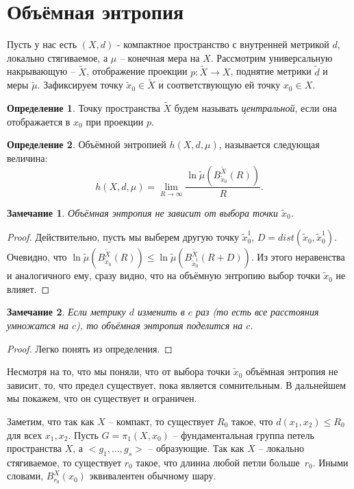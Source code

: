 \documentclass[11pt]{article}
\theoremstyle{definition}
\newtheorem{defin}{Определение}%
\theoremstyle{plain}
\theoremstyle{plain}
\newtheorem{remark}{Замечание}
\def\leq{\leqslant}
\def\wt#1{\widetilde{#1}}
\begin{document}
\section{Объёмная энтропия}
Пусть у нас есть $(X, d)$ - компактное пространство с внутренней метрикой $d$, локально стягиваемое, 
а $\mu$ -- конечная мера на $X$. Рассмотрим универсальную накрывающую -- $\wt{X}$, отображение проекции $p : \wt{X} \rightarrow X$, 
поднятие метрики $\wt{d}$ и меры $\wt{\mu}$.
Зафиксируем точку $\wt{x}_0 \in \wt{X}$ и соответствующую ей точку $x_0 \in X$.
\begin{defin}
Точку пространства $\wt{X}$  будем называть {\it центральной}, если она отображается в $x_0$ при проекции $p$.
\end{defin}

\begin{defin}
	Объёмной энтропией $h(X, d, \mu)$, называется следующая величина:
	$$
	h(X, d, \mu) = \lim_{R \rightarrow \infty} \frac{\ln\wt{\mu}\left(B_{\wt{x}_0}^{\wt{X}}(R)\right)} {R}.
	$$
\end{defin}


\begin{remark}
Объёмная энтропия не зависит от выбора точки $\wt{x}_0$.
\end{remark}
\begin{proof}
Действительно, пусть мы выберем другую точку $\wt{x}^1_0$, $D = dist(\wt{x}_0, \wt{x}_0^1)$.
Очевидно, что $\ln\wt{\mu}\left(B_{\wt{x}_0}^{\wt{X}}(R)\right) \leq 
\ln\wt{\mu}\left(B_{\wt{x}_0^1}^{\wt{X}}(R + D)\right)$. Из этого неравенства и аналогичного ему, сразу видно, 
что на объёмную энтропию выбор точки $\wt{x}_0$ не влияет.
\end{proof}

\begin{remark}
Если метрику $d$ изменить в $c$ раз (то есть все расстояния умножатся на $c$), то объёмная энтропия поделится на $c$.
\end{remark}
\begin{proof}
Легко понять из определения.
\end{proof}

Несмотря на то, что мы поняли, что от выбора точки $\wt{x}_0$ объёмная энтропия не зависит, 
то, что предел существует, пока является сомнительным. В дальнейшем мы покажем, что он существует и ограничен.

Заметим, что так как $X$ -- компакт, то существует $R_0$ такое, что $d(x_1, x_2) \leq R_0$ для всех $x_1, x_2$.
Пусть $G = \pi_1(X, x_0)$ -- фундаментальная группа петель пространства $X$, а $<g_1,\dots,g_s>$ -- образующие.
Так как $X$ -- локально стягиваемое, то существует $r_0$ такое, что длинна любой петли больше~$r_0$. 
Иными словами, $B_{r_0}^X(x_0)$ эквивалентен обычному шару.
\end{document}
